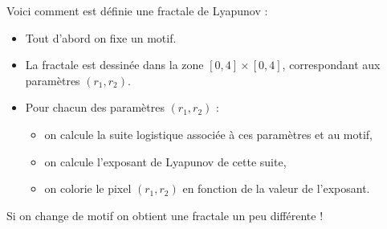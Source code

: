 \documentclass[11pt,class=report,crop=false]{standalone}
\begin{document}
\begin{cours}
\begin{itemize}
\end{itemize}



\end{cours}


\begin{cours}

Voici comment est définie une fractale de Lyapunov :
\begin{itemize}
  \item Tout d'abord on fixe un motif.
  \item La fractale est dessinée dans la zone $[0,4] \times [0,4]$, correspondant 
  aux paramètres $(r_1,r_2)$.
  \item Pour chacun des paramètres $(r_1,r_2)$ : 
  \begin{itemize} 
    \item on calcule la suite logistique associée à ces paramètres et au motif,
    \item on calcule l'exposant de Lyapunov de cette suite,
    \item on colorie le pixel $(r_1,r_2)$ en fonction de la valeur de l'exposant.
  \end{itemize} 
\end{itemize}
  
Si on change de motif on obtient une fractale un peu différente !



\end{cours}


\end{document}
